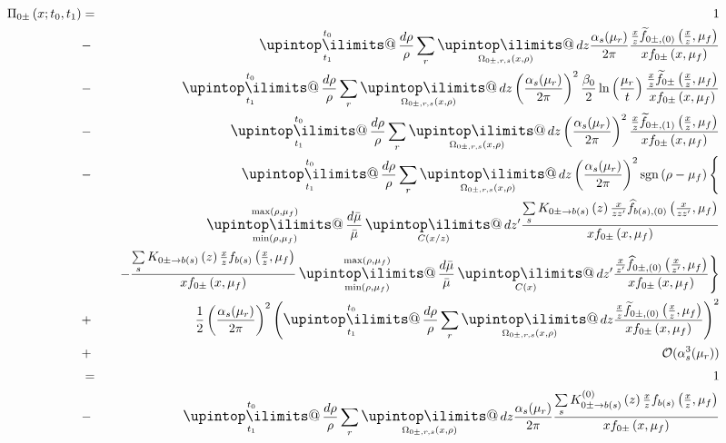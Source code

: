 \documentclass[a4paper,11pt]{article}
\makeatletter
\newcommand{\sgn}[2]{\mathrm{sgn}\left(#1-#2\right)}
\newcommand{\xfhat}[3]{#2 \widehat{f}_{#1}\left(#2, #3\right)}
\newcommand{\xftilde}[3]{#2 \widetilde{f}_{#1}\left(#2, #3\right)}
\newcommand{\xf}[3]{#2 f_{#1}\left(#2, #3\right)}
\newcommand{\noem}[4]{\Pi_{#1}\left(#2; #3, #4\right)}
\newcommand{\pskernel}[3]{K_{#1\rightarrow #2}\left(#3\right)}
\newcommand{\lopskernel}[3]{K_{#1\rightarrow #2}^{(0)}\left(#3\right)}
\newcommand{\upint}{\DOTSI\upintop\ilimits@}
\renewcommand{\int}{\mathop{\mathlarger{\upint}}}
\makeatother
\begin{document}
\begin{eqnarray*}
\noem{0\pm}{x}{t_0}{t_1}
&=& 1
%
%
%
\\
&-&
\int\displaylimits_{t_1}^{t_0} \frac{d\rho}{\rho} \sum\limits_{r}\int\displaylimits_{\Omega_{0\pm,r,s}(x,\rho)} dz
\frac{\alpha_s(\mu_r)}{2\pi}
\frac{\xftilde{0\pm,(0)}{\frac{x}{z}}{\mu_f}}{\xf{0\pm}{x}{\mu_f}} 
\\
&-&
\int\displaylimits_{t_1}^{t_0} \frac{d\rho}{\rho} \sum\limits_{r} \int\displaylimits_{\Omega_{0\pm,r,s}(x,\rho)} dz
\left(\frac{\alpha_s(\mu_r)}{2\pi}\right)^2
\frac{\beta_0}{2}\ln\left(\frac{\mu_r}{t}\right)
\frac{\xftilde{0\pm}{\frac{x}{z}}{\mu_f}}{\xf{0\pm}{x}{\mu_f}}
\\
&-&
\int\displaylimits_{t_1}^{t_0} \frac{d\rho}{\rho} \sum\limits_{r} \int\displaylimits_{\Omega_{0\pm,r,s}(x,\rho)} dz
\left(\frac{\alpha_s(\mu_r)}{2\pi}\right)^2
\frac{\xftilde{0\pm,(1)}{\frac{x}{z}}{\mu_f}}{\xf{0\pm}{x}{\mu_f}} 
\\
&-&
\int\displaylimits_{t_1}^{t_0} \frac{d\rho}{\rho} \sum\limits_{r} \int\displaylimits_{\Omega_{0\pm,r,s}(x,\rho)} dz
\left(\frac{\alpha_s(\mu_r)}{2\pi}\right)^2
\sgn{\rho}{\mu_f}
\Bigg\{
\\&&\qquad
\int\displaylimits_{\min(\rho,\mu_f) }^{\max(\rho,\mu_f)}\frac{d\bar\mu}{\bar\mu}
\int\displaylimits_{C(x/z)}  dz' 
\frac{ \sum\limits_s \pskernel{0\pm}{b(s)}{z} \xfhat{b(s),(0)}{\frac{x}{zz'}}{\mu_f} }{\xf{0\pm}{x}{\mu_f}}
\\&&\quad -
\frac{ \sum\limits_s \pskernel{0\pm}{b(s)}{z} \xf{b(s)}{\frac{x}{z}}{\mu_f} }{\xf{0\pm}{x}{\mu_f}}
\int\displaylimits_{\min(\rho,\mu_f) }^{\max(\rho,\mu_f)}\frac{d\bar\mu}{\bar\mu}
\int\displaylimits_{C(x)}  dz' 
\frac{\xfhat{0\pm,(0)}{\frac{x}{z'}}{\mu_f}}{\xf{0\pm}{x}{\mu_f}}
\Bigg\}
\\&+&
\frac{1}{2}
\left(\frac{\alpha_s(\mu_r)}{2\pi}\right)^2
\left(
\int\displaylimits_{t_1}^{t_0} \frac{d\rho}{\rho} \sum\limits_{r} \int\displaylimits_{\Omega_{0\pm,r,s}(x,\rho)} dz
\frac{\xftilde{0\pm,(0)}{\frac{x}{z}}{\mu_f}}{\xf{0\pm}{x}{\mu_f}} 
\right)^2
\\
&+&
\mathcal{O}(\alpha_s^3(\mu_r))
%
%
%
%
\\
&=& 1
%
%
%
\\
&-&
\int\displaylimits_{t_1}^{t_0} \frac{d\rho}{\rho} \sum\limits_{r}\int\displaylimits_{\Omega_{0\pm,r,s}(x,\rho)} dz
\frac{\alpha_s(\mu_r)}{2\pi}
\frac{\sum\limits_s\lopskernel{0\pm}{b(s)}{z} \xf{b(s)}{\frac{x}{z}}{\mu_f}}{\xf{0\pm}{x}{\mu_f}} 
\\

\end{eqnarray*}
\end{document}
